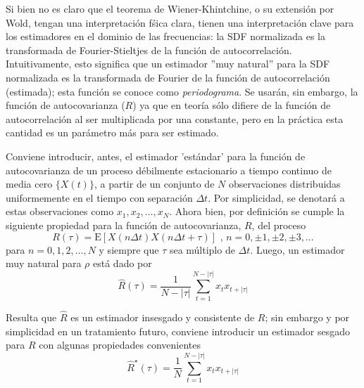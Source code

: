 \documentclass[12pt,a4paper]{mitthesis}
\newcommand{\aste}[1]{\widehat{ #1 }^{\star}}
\newcommand{\E}[1]{\mathrm{E}\left[ #1 \right]}
\newcommand{\abso}[1]{\left| #1 \right|}
\begin{document}

Si bien no es claro que el teorema de Wiener-Khintchine, o su extensi\'on por Wold, tengan una 
interpretaci\'on f\'sica clara, tienen una interpretaci\'on clave para los estimadores en el 
dominio de las frecuencias: la SDF normalizada es la transformada de Fourier-Stieltjes de la 
funci\'on de autocorrelaci\'on.
Intuitivamente, esto significa que un estimador ''muy natural'' para la SDF normalizada es la 
transformada de Fourier de la funci\'on de autocorrelaci\'on (estimada); esta funci\'on se conoce 
como \textit{periodograma}. Se usar\'an, sin embargo, la funci\'on de autocovarianza ($R$) ya que 
en teor\'ia s\'olo difiere de la funci\'on de autocorrelaci\'on al ser multiplicada por una 
constante, pero en la pr\'actica esta cantidad es un par\'ametro m\'as para ser estimado.

Conviene introducir, antes, el estimador 'est\'andar' para la funci\'on de autocovarianza de un 
proceso d\'ebilmente estacionario a tiempo continuo de media cero $\{ X(t) \}$, a partir de un 
conjunto de $N$ observaciones distribuidas uniformemente en el tiempo con separaci\'on $\Delta t$.
Por simplicidad, se denotar\'a a estas observaciones como $x_1, x_2 , \dots, x_N$. Ahora bien, por 
definici\'on se cumple la siguiente propiedad para la funci\'on de autocovarianza, $R$, del proceso
\begin{equation*}
R(\tau)
= \E{X(n\Delta t)X(n\Delta t + \tau)} \text{  ,  } n = 0,\pm 1,\pm 2, \pm 3,\dots
\end{equation*}
para $n = 0, 1, 2, \dots, N$ y siempre que $\tau$ sea m\'ultiplo de
$\Delta t$. Luego, un estimador muy natural para $\rho$ est\'a dado por
\begin{equation}
\widehat{R}(\tau) = \frac{1}{N-\abso{\tau}} 
\sum_{t = 1}^{N-\abso{\tau}} x_t x_{t+\abso{\tau}}
\label{estimador_R}
\end{equation}

Resulta que $\widehat{R}$ es un estimador insesgado y consistente de $R$; sin embargo y por 
simplicidad en un tratamiento futuro, conviene introducir un estimador sesgado para $R$ con algunas 
propiedades convenientes
\begin{equation}
\aste{R}(\tau) = \frac{1}{N} 
\sum_{t = 1}^{N-\abso{\tau}} x_t x_{t+\abso{\tau}}
\label{estimador_R_ast}
\end{equation}
\end{document}
